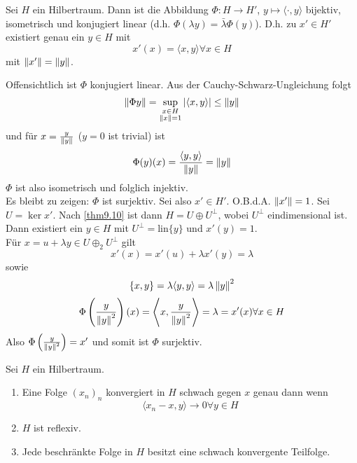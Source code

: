 \begin{theorem}
	Sei $ H $ ein Hilbertraum. Dann ist die Abbildung $ \Phi\colon H\rightarrow H' $, $ y\mapsto \langle\cdot,y\rangle $ bijektiv, isometrisch und konjugiert linear (d.h. $ \Phi(\lambda y)=\bar{\lambda}\Phi(y) $). D.h. zu $ x'\in H' $ existiert genau ein $ y\in H $ mit
	\[ x'(x)=\langle x,y\rangle\forall x\in H \]
	mit $ \left\|x'\right\|=\left\|y\right\| $.
\end{theorem}
\begin{beweis}
	Offensichtlich ist $ \Phi $ konjugiert linear. Aus der Cauchy-Schwarz-Ungleichung folgt
	\[ \left\|\Phi y\right\|=\sup_{\substack{x\in H\\\left\|x\right\|=1}}|\langle x,y\rangle|\leq\left\|y\right\| \]
	und f\"ur $ x=\frac{y}{\left\|y\right\|} $ ($ y=0 $ ist trivial) ist
	\[ \Phi(y)(x)=\frac{\langle y,y\rangle}{\left\|y\right\|}=\left\|y\right\| \]
	$ \Phi $ ist also isometrisch und folglich injektiv.\\
	Es bleibt zu zeigen: $ \Phi $ ist surjektiv. Sei also $ x'\in H' $. O.B.d.A. $ \left\|x'\right\|=1 $. Sei $ U=\ker x' $. Nach \ref{thm9.10} ist dann $ H=U\oplus U^\perp  $, wobei $ U^\perp $ eindimensional ist. Dann existiert ein $ y\in H $ mit $ U^\perp=\text{lin}\lbrace y\rbrace $ und $ x'(y)=1 $.\\
	F\"ur $ x=u+\lambda y\in U\oplus_2 U^\perp $ gilt
	\[ x'(x)=x'(u)+\lambda x'(y)=\lambda \]
	sowie
	\[ \lbrace x,y\rbrace=\lambda\langle y,y\rangle=\lambda\left\|y\right\|^2 \]
	\[ \Phi\left(\frac{y}{\left\|y\right\|^2}\right)(x)=\left\langle x,\frac{y}{\left\|y\right\|^2}\right\rangle=\lambda=x'(x)\forall x\in H \]
	Also $ \Phi\left(\frac{y}{\left\|y\right\|^2}\right)=x' $ und somit ist $ \Phi $ surjektiv.
\end{beweis}
\begin{korollar}
	Sei $ H $ ein Hilbertraum.
	\begin{enumerate}
		\item Eine Folge $ (x_n)_n $ konvergiert in $ H $ schwach gegen $ x $ genau dann wenn
		\[ \langle x_n-x,y\rangle\rightarrow 0\forall y\in H \]
		\item $ H $ ist reflexiv.
		\item Jede beschr\"ankte Folge in $ H $ besitzt eine schwach konvergente Teilfolge.
	\end{enumerate}
\end{korollar}
